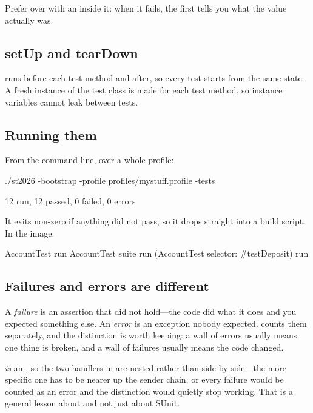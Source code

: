 Prefer  over  with an \ct{=} inside it: when it
fails, the first tells you what the value actually was.

\subsection{setUp and tearDown}

 runs before each test method and  after, so every test
starts from the same state. A fresh instance of the test class is made for
each test method, so instance variables cannot leak between tests.

\subsection{Running them}

From the command line, over a whole profile:

\begin{sh}
./st2026 -bootstrap -profile profiles/mystuff.profile -tests
\end{sh}

\begin{plain}
12 run, 12 passed, 0 failed, 0 errors
\end{plain}

It exits non-zero if anything did not pass, so it drops straight into a
build script. In the image:

\begin{st}
AccountTest run
AccountTest suite run
(AccountTest selector: #testDeposit) run
\end{st}

\subsection{Failures and errors are different}

A \emph{failure} is an assertion that did not hold---the code did what it does
and you expected something else. An \emph{error} is an exception nobody
expected.  counts them separately, and the distinction is worth
keeping: a wall of errors usually means one thing is broken, and a wall of
failures usually means the code changed.

\begin{stnote}
 \emph{is} an , so the two handlers in
 are nested rather than side by side---the more specific one
has to be nearer up the sender chain, or every failure would be counted as an
error and the distinction would quietly stop working. That is a general lesson
about  and not just about SUnit.
\end{stnote}

